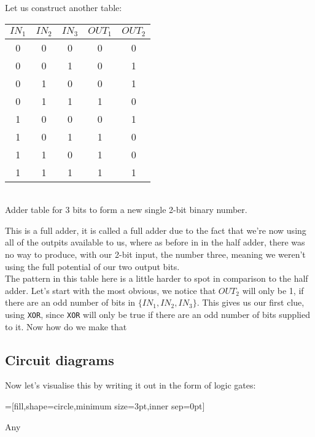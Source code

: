 \documentclass{article}
\newcommand{\code}[1]{\texttt{#1}}
\begin{document}
Let us construct another table:
\begin{center}
\begin{tabular}{ | c c c | c c | }
 \hline
    $IN_1$ & $IN_2$ & $IN_3$ & $OUT_1$ & $OUT_2$\\
 \hline
    0 & 0 & 0 & 0 & 0\\
 \hline
    0 & 0 & 1 & 0 & 1\\
 \hline
    0 & 1 & 0 & 0 & 1\\
 \hline
    0 & 1 & 1 & 1 & 0\\
 \hline
    1 & 0 & 0 & 0 & 1\\
 \hline
    1 & 0 & 1 & 1 & 0\\
 \hline
    1 & 1 & 0 & 1 & 0\\
 \hline
    1 & 1 & 1 & 1 & 1\\
 \hline
\end{tabular}
\\ \vspace{2mm} Adder table for 3 bits to form a new single 2-bit binary number.
\end{center}

This is a full adder, it is called a full adder due to the fact that we're now using all of the outpits available to us, where as before in in the half adder, there was no way to produce, with our 2-bit input, the number three, meaning we weren't using the full potential of our two output bits.\\

The pattern in this table here is a little harder to spot in comparison to the half adder. Let's start with the most obvious, we notice that $OUT_2$ will only be 1, if there are an odd number of bits in $\{IN_1, IN_2, IN_3\}$. This gives us our first clue, using \code{XOR}, since \code{XOR} will only be true if there are an odd number of bits supplied to it. Now how do we make that 

\subsection{Circuit diagrams}
Now let's visualise this by writing it out in the form of logic gates:


\begin{center}
    =[fill,shape=circle,minimum size=3pt,inner sep=0pt]
\end{center}
Any 
\end{document}
